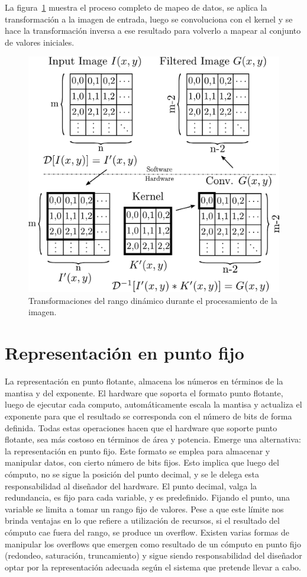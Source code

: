 La figura~\ref{transformation} muestra el proceso completo de mapeo de datos, se
aplica la transformación a la imagen de entrada, luego se convoluciona con el
kernel y se hace la transformación inversa a ese resultado para volverlo a
mapear al conjunto de valores iniciales.

\begin{figure}
\centering
\includegraphics[scale=0.47]{wflow3}
\caption{Transformaciones del rango dinámico durante el procesamiento de la imagen.}
\label{transformation}
\end{figure}

\section{Representación en punto fijo}\label{fixedpoint}

La representación en punto flotante, almacena los números en términos de la mantisa y del exponente. El hardware que soporta el formato punto flotante, luego de ejecutar cada computo, 
automáticamente escala la mantisa y actualiza el exponente para que el resultado se corresponda con el número de bits de forma definida. Todas estas operaciones hacen que el hardware que soporte punto flotante,
sea más costoso en términos de área y potencia. Emerge una alternativa: la representación en punto fijo.
Este formato se emplea para almacenar y manipular datos, con cierto número de bits fijos. Esto implica que luego del cómputo, no se sigue la posición del punto decimal, y
se le delega esta responsabilidad al diseñador del hardware. El punto decimal, valga la redundancia, es fijo para cada variable, y es predefinido.
Fijando el punto, una variable se limita a tomar un rango fijo de valores.
Pese a que este límite nos brinda ventajas en lo que refiere a utilización de recursos, si el resultado del cómputo cae fuera del rango, se produce un overflow. Existen varias
formas de manipular los overflows que emergen como resultado de un cómputo en punto fijo (redondeo, saturación, truncamiento) y sigue siendo responsabilidad del diseñador optar por
la representación adecuada según el sistema que pretende llevar a cabo.


